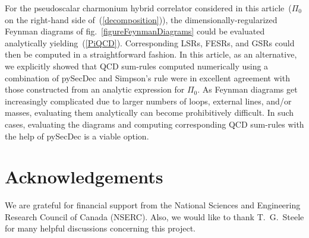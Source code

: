 \documentclass[12pt, letterpaper]{article}
\newcommand{\add}[1]{#1}
\begin{document}
For the pseudoscalar charmonium hybrid correlator
considered in this article~($\Pi_0$ on the right-hand side of~(\ref{decomposition})), 
the dimensionally-regularized Feynman diagrams of fig.~\ref{figureFeynmanDiagrams} 
could be evaluated analytically yielding~(\ref{PiQCD}).
Corresponding LSRs\add{, FESRs, and GSRs} 
could then be computed in a straightforward fashion.
In this article, as an alternative, we explicitly showed that
\add{QCD sum-rules}
computed numerically using a combination of pySecDec and Simpson's rule
were in excellent
agreement with those constructed from an analytic expression for $\Pi_0$.
As Feynman diagrams get increasingly complicated due to larger numbers
of loops, external lines, and/or masses, evaluating them analytically can 
become prohibitively difficult. 
In such cases, evaluating the diagrams and
computing corresponding \add{QCD sum-rules} with the help of pySecDec is a viable option. 

\clearpage
\section*{Acknowledgements}
We are grateful for financial support from the National Sciences and 
Engineering Research Council of Canada (NSERC).
Also, we would like to thank T.~G.~Steele for many helpful discussions concerning this project.



\end{document}
